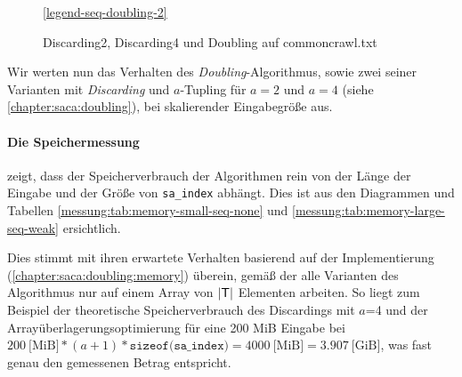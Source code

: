 \begin{figure}[ht]

    \medskip
    \ref{legend-seq-doubling-2}
    \caption{Discarding2, Discarding4 und Doubling auf commoncrawl.txt}
\end{figure}
\FloatBarrier

Wir werten nun das Verhalten des \textit{Doubling}-Algorithmus, sowie zwei seiner Varianten mit \textit{Discarding} und $a$-Tupling für $a=2$ und $a=4$ (siehe \cref{chapter:saca:doubling}), bei skalierender Eingabegröße aus.

\paragraph{Die Speichermessung} zeigt, dass der Speicherverbrauch der Algorithmen rein von der Länge der Eingabe und der Größe von \texttt{sa\_index} abhängt. Dies ist aus den Diagrammen und Tabellen \ref{messung:tab:memory-small-seq-none} und \ref{messung:tab:memory-large-seq-weak} ersichtlich.

Dies stimmt mit ihren erwartete Verhalten basierend auf der Implementierung (\cref{chapter:saca:doubling:memory}) überein, gemäß der alle Varianten des Algorithmus nur auf einem Array von $|\inputtext|$ Elementen arbeiten. So liegt zum Beispiel der theoretische Speicherverbrauch des Discardings mit $a$=4 und der Arrayüberlagerungsoptimierung für eine 200 MiB Eingabe bei $200~\text{[MiB]} * (a+1) * \texttt{sizeof(sa\_index)} = 4000~\text{[MiB]} = 3.907~\text{[GiB]}$, was fast genau den gemessenen Betrag entspricht.

